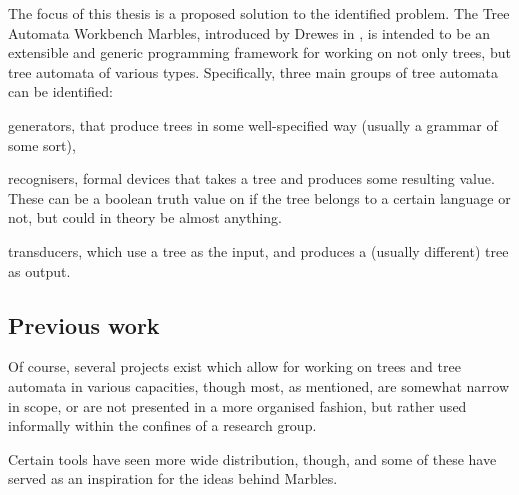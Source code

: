 The focus of this thesis is a proposed solution to the identified problem.
The Tree Automata Workbench Marbles, introduced by Drewes in \cite{TODO},
is intended to be an extensible and generic programming framework for
working on not only trees, but tree automata of various types.
Specifically, three main groups of tree automata can be identified:

\begin{compactitem}
\item generators, that produce trees in some well-specified way (usually a
grammar of some sort),
\item recognisers, formal devices that takes a tree and produces some
resulting value. These can be a boolean truth value on if the tree belongs
to a certain language or not, but could in theory be almost anything.
\item transducers, which use a tree as the input, and produces a (usually
different) tree as output.
\end{compactitem}

\subsection{Previous work}

Of course, several projects exist which allow for working on trees and tree
automata in various capacities, though most, as mentioned, are somewhat
narrow in scope, or are not presented in a more organised fashion, but
rather used informally within the confines of a research group.

Certain tools have seen more wide distribution, though, and some of these
have served as an inspiration for the ideas behind Marbles.

